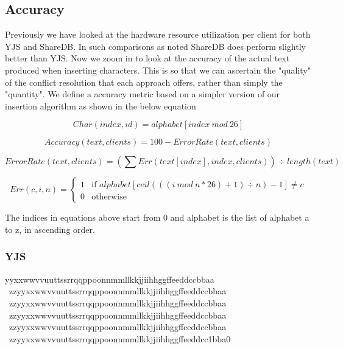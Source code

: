 \documentclass[12pt]{article}
\begin{document}
  \subsection{Accuracy}
  Previously we have looked at the hardware resource utilization per client for both YJS and ShareDB. In such comparisons as noted ShareDB does
  perform slightly better than YJS. Now we zoom in to look at the accuracy of the actual text produced when inserting characters.
  This is so that we can ascertain the "quality" of the conflict resolution that each approach offers, rather than simply the "quantity".
  We define a accuracy metric based on a simpler version of our insertion algorithm as shown in the below equation

  \begin{equation} \label{simple_insertion_algorithm_character}
    Char(index, id) = alphabet[index\ mod\ 26]
  \end{equation}

  \begin{equation} \label{overall_accuracy_measure}
    Accuracy(text, clients) = 100 - ErrorRate(text, clients)
  \end{equation}

  \begin{equation} \label{overall_accuracy_measure}
    ErrorRate(text, clients) = (\sum Err(text[index], index, clients)) \div length(text)
  \end{equation}

  \begin{equation} \label{error_calculation}
    Err(c, i, n) = 
    \left\{
	    \begin{array}{ll}
        1 & \mbox{if } alphabet[ceil(((i\ mod\ n * 26) + 1) \div n)-1] \neq c \\
        0 & \mbox{otherwise }
	    \end{array}
    \right.
  \end{equation}

  The indices in equations above start from 0 and alphabet is the list of alphabet a to z, in ascending order.
  
  \subsubsection{YJS}
  yyxxwwvvuuttssrrqqppoonnmmllkkjjiihhggffeeddccbbaa \ zzyyxxwwvvuuttssrrqqppoonnmmllkkjjiihhggffeeddccbbaa \ zzyyxxwwvvuuttssrrqqppoonnmmllkkjjiihhggffeeddccbbaa \ zzyyxxwwvvuuttssrrqqppoonnmmllkkjjiihhggffeeddccbbaa \ zzyyxxwwvvuuttssrrqqppoonnmmllkkjjiihhggffeeddccbbaa \ zzyyxxwwvvuuttssrrqqppoonnmmllkkjjiihhggffeeddcc1bba0
\end{document}
